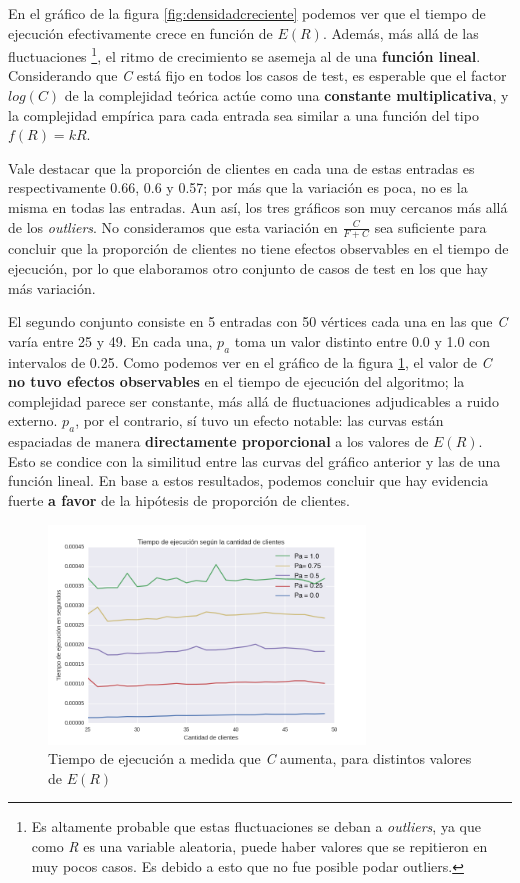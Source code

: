 \documentclass[a4paper]{report}
\begin{document}
\newpage

En el gráfico de la figura \ref{fig:densidadcreciente} podemos ver que el tiempo de ejecución efectivamente crece en función de $E(R)$. Además, más allá de las fluctuaciones \footnote{Es altamente probable que estas fluctuaciones se deban a \textit{outliers}, ya que como \textit{R} es una variable aleatoria, puede haber valores que se repitieron en muy pocos casos. Es debido a esto que no fue posible podar outliers.}, el ritmo de crecimiento se asemeja al de una \textbf{función lineal}. Considerando que \textit{C} está fijo en todos los casos de test, es esperable que el factor $log(C)$ de la complejidad teórica actúe como una \textbf{constante multiplicativa}, y la complejidad empírica para cada entrada sea similar a una función del tipo $f(R) = kR$.

Vale destacar que la proporción de clientes en cada una de estas entradas es respectivamente 0.66, 0.6 y 0.57; por más que la variación es poca, no es la misma en todas las entradas. Aun así, los tres gráficos son muy cercanos más allá de los \textit{outliers}. No consideramos que esta variación en $\frac{C}{F+C}$ sea suficiente para concluir que la proporción de clientes no tiene efectos observables en el tiempo de ejecución, por lo que elaboramos otro conjunto de casos de test en los que hay más variación.

El segundo conjunto consiste en 5 entradas con 50 vértices cada una en las que \textit{C} varía entre 25 y 49. En cada una, $p_a$ toma un valor distinto entre 0.0 y 1.0 con intervalos de 0.25. Como podemos ver en el gráfico de la figura \ref{fig:ccreciente}, el valor de \textit{C} \textbf{no tuvo efectos observables} en el tiempo de ejecución del algoritmo; la complejidad parece ser constante, más allá de fluctuaciones adjudicables a ruido externo. $p_a$, por el contrario, sí tuvo un efecto notable: las curvas están espaciadas de manera \textbf{directamente proporcional} a los valores de $E(R)$. Esto se condice con la similitud entre las curvas del gráfico anterior y las de una función lineal. En base a estos resultados, podemos concluir que hay evidencia fuerte \textbf{a favor} de la hipótesis de proporción de clientes.

\begin{figure}[!h]
    \centering
    \includegraphics[width=0.75\textwidth]{ccreciente.png}
    \caption{Tiempo de ejecución a medida que \textit{C} aumenta, para distintos valores de $E(R)$}
    \label{fig:ccreciente}
\end{figure}
\end{document}
